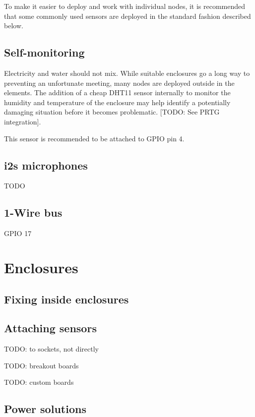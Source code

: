 \documentclass[
]{book}
\begin{document}
To make it easier to deploy and work with individual nodes, it is recommended that some commonly used sensors are deployed in the standard fashion described below.

\subsection{Self-monitoring}\label{self-monitoring}

Electricity and water should not mix. While suitable enclosures go a long way to preventing an unfortunate meeting, many nodes are deployed outside in the elements. The addition of a cheap DHT11 sensor internally to monitor the humidity and temperature of the enclosure may help identify a potentially damaging situation before it becomes problematic. {[}TODO: See PRTG integration{]}.

This sensor is recommended to be attached to GPIO pin 4.

\subsection{i2s microphones}\label{i2s-microphones}

TODO

\subsection{1-Wire bus}\label{wire-bus}

GPIO 17

\section{Enclosures}\label{enclosures}

\subsection{Fixing inside enclosures}\label{fixing-inside-enclosures}

\subsection{Attaching sensors}\label{attaching-sensors}

TODO: to sockets, not directly

TODO: breakout boards

TODO: custom boards

\subsection{Power solutions}\label{power-solutions}
\end{document}
